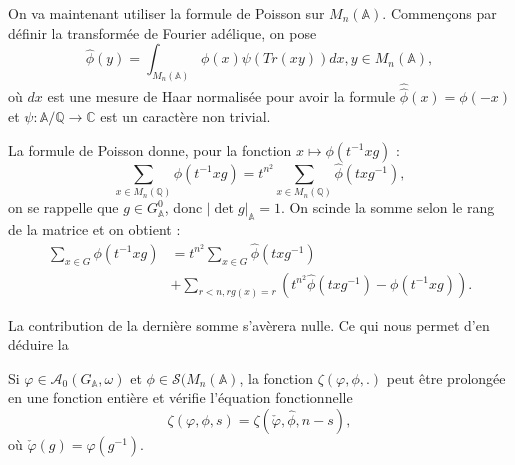 On va maintenant utiliser la formule de Poisson sur $M_n(\mathbb{A})$. Commençons par définir la transformée de Fourier adélique, on pose
\begin{equation}
\hat{\phi}(y) = \int_{M_n(\mathbb{A})} \phi(x)\psi(Tr(xy))dx, y \in M_n(\mathbb{A}),
\end{equation}
où $dx$ est une mesure de Haar normalisée pour avoir la formule $\hat{\hat{\phi}}(x)=\phi(-x)$ et $\psi : \mathbb{A}/\mathbb{Q} \rightarrow \mathbb{C}$ est un caractère non trivial.

La formule de Poisson donne, pour la fonction $x \mapsto \phi(t^{-1}xg)$ :
\begin{equation}
\sum_{x \in M_n(\mathbb{Q})} \phi(t^{-1}xg) = t^{n^2}\sum_{x \in M_n(\mathbb{Q})} \hat{\phi}(txg^{-1}),
\end{equation}
on se rappelle que $g \in G^0_\mathbb{A}$, donc $|\det g|_\mathbb{A}=1$. On scinde la somme selon le rang de la matrice et on obtient :
\begin{equation}
\begin{split}
\sum_{x \in G} \phi(t^{-1}xg) &= t^{n^2}\sum_{x \in G} \hat{\phi}(txg^{-1}) \\
&+ \sum_{r < n, rg(x)=r} \left( t^{n^2}\hat{\phi}(txg^{-1}) - \phi(t^{-1}xg)\right).
\end{split}
\end{equation}

La contribution de la dernière somme s'avèrera nulle. Ce qui nous permet d'en déduire la
\begin{proposition}
Si $\varphi \in \mathcal{A}_0(G_\mathbb{A}, \omega)$ et $\phi \in \mathcal{S}(M_n(\mathbb{A})$, la fonction $\zeta(\varphi, \phi, .)$ peut être prolongée en une fonction entière et vérifie l'équation fonctionnelle
\begin{equation}
\label{eqcusp}
\zeta(\varphi, \phi, s) = \zeta(\check{\varphi}, \hat{\phi}, n-s),
\end{equation}
où $\check{\varphi}(g)=\varphi(g^{-1})$.
\end{proposition}

